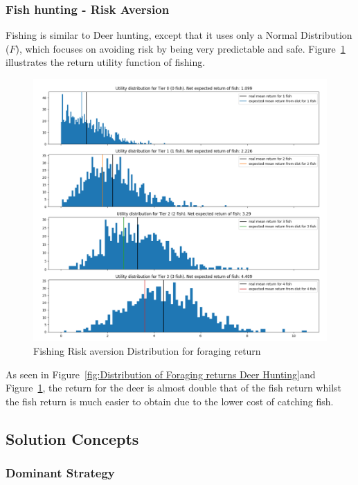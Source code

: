 \newpage
\subsubsection{Fish hunting - Risk Aversion}

Fishing is similar to Deer hunting, except that it uses only a Normal Distribution ($F$), which focuses on avoiding risk by being very predictable and safe. Figure~\ref{fig:Distribution of Foraging returns Fishing} illustrates the return utility function of fishing.

\begin{figure}[!htb]
    \centering
    \includegraphics[width=1\textwidth]{04_environment/Images/Distribution of Foraging returns Fishing.PNG}
    \caption{Fishing Risk aversion Distribution for foraging return}
    \label{fig:Distribution of Foraging returns Fishing}
\end{figure}

As seen in Figure~\ref{fig:Distribution of Foraging returns Deer Hunting}and Figure~\ref{fig:Distribution of Foraging returns Fishing}, the return for the deer is almost double that of the fish return whilst the fish return is much easier to obtain due to the lower cost of catching fish.

\newpage
\subsection{Solution Concepts}
\subsubsection{Dominant Strategy}


